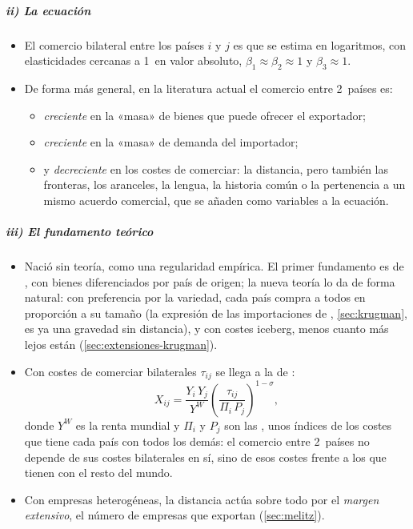 \documentclass[11pt]{article}
\begin{document}
\subparagraph{ii) La ecuación}

\begin{itemize}
\item El comercio bilateral entre los países $i$ y $j$ es
  que se estima en logaritmos, con elasticidades cercanas a 1~en valor absoluto, $\beta_1\approx\beta_2\approx 1$ y $\beta_3\approx 1$\nocite{HeadMayer2014Gravity}.
\item De forma más general, en la literatura actual el comercio entre 2~países es:
  \begin{itemize}
  \item \emph{creciente} en la «masa» de bienes que puede ofrecer el exportador;
  \item \emph{creciente} en la «masa» de demanda del importador;
  \item y \emph{decreciente} en los costes de comerciar: la distancia, pero también las fronteras, los aranceles, la lengua, la historia común o la pertenencia a un mismo acuerdo comercial, que se añaden como variables a la ecuación.
  \end{itemize}
\end{itemize}

\subparagraph{iii) El fundamento teórico}

\begin{itemize}
\item Nació sin teoría, como una regularidad empírica. El primer fundamento es de \textcite{Anderson1979Theoretical}, con bienes diferenciados por país de origen; la nueva teoría lo da de forma natural: con preferencia por la variedad, cada país compra a todos en proporción a su tamaño (la expresión de las importaciones de , \ref{sec:krugman}, es ya una gravedad sin distancia), y con costes iceberg, menos cuanto más lejos están (\ref{sec:extensiones-krugman}).
\item Con costes de comerciar bilaterales $\tau_{ij}$ se llega a la  de \textcite{AndersonvanWincoop2003Gravity}:
  $$X_{ij}=\frac{Y_i\,Y_j}{Y^W}\left(\frac{\tau_{ij}}{\Pi_i\,P_j}\right)^{1-\sigma},$$
  donde $Y^W$ es la renta mundial y $\Pi_i$ y $P_j$ son las , unos índices de los costes que tiene cada país con todos los demás: el comercio entre 2~países no depende de sus costes bilaterales en sí, sino de esos costes frente a los que tienen con el resto del mundo.
\item Con empresas heterogéneas, la distancia actúa sobre todo por el \emph{margen extensivo}, el número de empresas que exportan\nocite{Chaney2008Distorted} (\ref{sec:melitz}).
\end{itemize}
\end{document}
